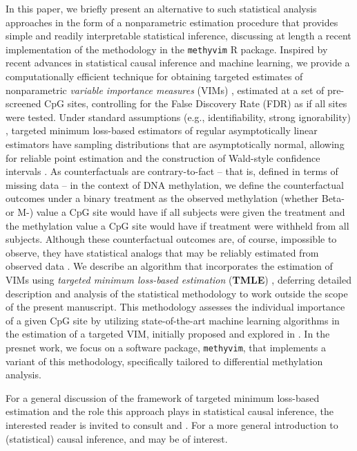 \documentclass[9pt,a4paper,]{extarticle}
\theoremstyle{definition}
\theoremstyle{definition}
\theoremstyle{definition}
\theoremstyle{remark}
\begin{document}
In this paper, we briefly present an alternative to such statistical analysis
approaches in the form of a nonparametric estimation procedure that provides
simple and readily interpretable statistical inference, discussing at length a
recent implementation of the methodology in the \texttt{methyvim} R package. Inspired
by recent advances in statistical causal inference and machine learning, we
provide a computationally efficient technique for obtaining targeted estimates
of nonparametric \emph{variable importance measures} (VIMs) \citep{vdl2006statistical},
estimated at a set of pre-screened CpG sites, controlling for the False
Discovery Rate (FDR) as if all sites were tested. Under standard assumptions
(e.g., identifiability, strong ignorability) \citep{pearl2009causality}, targeted
minimum loss-based estimators of regular asymptotically linear estimators have
sampling distributions that are asymptotically normal, allowing for reliable
point estimation and the construction of Wald-style confidence intervals
\citep[\citet{vdl2018targeted}]{vdl2011targeted}. As counterfactuals are contrary-to-fact --
that is, defined in terms of missing data -- in the context of DNA methylation,
we define the counterfactual outcomes under a binary treatment as the observed
methylation (whether Beta- or M-) value a CpG site would have if all subjects
were given the treatment and the methylation value a CpG site would have if
treatment were withheld from all subjects. Although these counterfactual
outcomes are, of course, impossible to observe, they have statistical analogs
that may be reliably estimated from observed data \citep{pearl2009causality}. We
describe an algorithm that incorporates the estimation of VIMs using \emph{targeted
minimum loss-based estimation} (\textbf{TMLE}) \citep{vdl2006targeted}, deferring detailed
description and analysis of the statistical methodology to work outside the
scope of the present manuscript. This methodology assesses the individual
importance of a given CpG site by utilizing state-of-the-art machine learning
algorithms in the estimation of a targeted VIM, initially proposed and explored
in \citep{tuglus2008targeted}. In the presnet work, we focus on a software package,
\texttt{methyvim}, that implements a variant of this methodology, specifically tailored
to differential methylation analysis.

For a general discussion of the framework of targeted minimum loss-based
estimation and the role this approach plays in statistical causal inference, the
interested reader is invited to consult \citet{vdl2011targeted} and \citet{vdl2018targeted}.
For a more general introduction to (statistical) causal inference,
\citet{pearl2009causality} and \citet{hernan2018causal} may be of interest.
\end{document}
